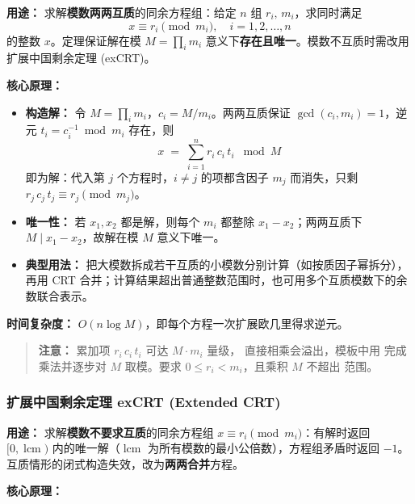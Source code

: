 \textbf{用途：}
求解\textbf{模数两两互质}的同余方程组：给定 $n$ 组 $r_i,\, m_i$，求同时满足
\[ x \equiv r_i \pmod{m_i}, \quad i = 1, 2, \dots, n \]
的整数 $x$。定理保证解在模 $M = \prod_{i} m_i$ 意义下\textbf{存在且唯一}。模数不互质时需改用扩展中国剩余定理 (exCRT)。

\textbf{核心原理：}

\begin{itemize}
  \item \textbf{构造解：} 令 $M = \prod_i m_i$，$c_i = M / m_i$。两两互质保证 $\gcd(c_i, m_i) = 1$，逆元 $t_i = c_i^{-1} \bmod m_i$ 存在，则
  \[ x \;=\; \sum_{i=1}^{n} r_i\, c_i\, t_i \;\bmod M \]
  即为解：代入第 $j$ 个方程时，$i \ne j$ 的项都含因子 $m_j$ 而消失，只剩 $r_j\, c_j\, t_j \equiv r_j \pmod{m_j}$。
  \item \textbf{唯一性：} 若 $x_1, x_2$ 都是解，则每个 $m_i$ 都整除 $x_1 - x_2$；两两互质下 $M \mid x_1 - x_2$，故解在模 $M$ 意义下唯一。
  \item \textbf{典型用法：} 把大模数拆成若干互质的小模数分别计算（如按质因子幂拆分），再用 CRT 合并；计算结果超出普通整数范围时，也可用多个互质模数下的余数联合表示。
\end{itemize}

\textbf{时间复杂度：} $O(n \log M)$，即每个方程一次扩展欧几里得求逆元。



\begin{quote}
\textbf{注意：} 累加项 $r_i\, c_i\, t_i$ 可达 $M \cdot m_i$ 量级， 直接相乘会溢出，模板中用  完成乘法并逐步对 $M$ 取模。要求 $0 \le r_i < m_i$，且乘积 $M$ 不超出  范围。
\end{quote}

\subsubsection{扩展中国剩余定理 exCRT (Extended CRT)}

\textbf{用途：}
求解\textbf{模数不要求互质}的同余方程组 $x \equiv r_i \pmod{m_i}$：有解时返回 $[0, \operatorname{lcm})$ 内的唯一解（$\operatorname{lcm}$ 为所有模数的最小公倍数），方程组矛盾时返回 $-1$。互质情形的闭式构造失效，改为\textbf{两两合并}方程。

\textbf{核心原理：}

